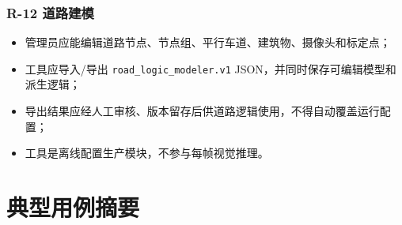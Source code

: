 \subsubsection{R-12 道路建模}\label{requirements-r-12-ux9053ux8defux5efaux6a21}

\begin{itemize}
\tightlist
\item
  管理员应能编辑道路节点、节点组、平行车道、建筑物、摄像头和标定点；
\item
  工具应导入/导出 \texttt{road\_\allowbreak{}logic\_\allowbreak{}modeler.\allowbreak{}v1} JSON，并同时保存可编辑模型和派生逻辑；
\item
  导出结果应经人工审核、版本留存后供道路逻辑使用，不得自动覆盖运行配置；
\item
  工具是离线配置生产模块，不参与每帧视觉推理。
\end{itemize}

\section{典型用例摘要}\label{requirements-ux5178ux578bux7528ux4f8bux6458ux8981}

